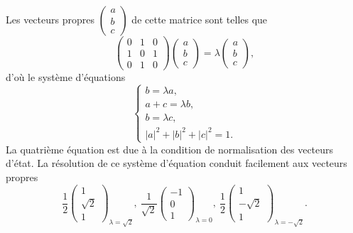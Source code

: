 \begin{example}
Les vecteurs propres $\begin{pmatrix} a\\b\\c\end{pmatrix} $ de cette matrice
sont telles que
\begin{equation}
\begin{pmatrix}
0 & 1 & 0\\
1 & 0 & 1\\
0 & 1 & 0
\end{pmatrix} \begin{pmatrix}
a\\
b\\
c
\end{pmatrix} =\lambda\begin{pmatrix}
a\\
b\\
c
\end{pmatrix} ,
\end{equation}
d'où le système d'équations%
\begin{equation}
\begin{cases}
b=\lambda a,\\
a+c=\lambda b,\\
b=\lambda c,\\
|a|^{2}+|b|^{2}+|c|^{2}=1.
\end{cases}
\end{equation}
La quatrième équation est due à la condition de normalisation des vecteurs
d'état. La résolution de ce système d'équation conduit facilement aux
vecteurs propres
\begin{equation}
\frac{1}{2}\begin{pmatrix}
1\\
\sqrt{2}\\
1
\end{pmatrix}
_{\lambda=\sqrt{2}},\ \frac{1}{\sqrt{2}}\begin{pmatrix}
-1\\
0\\
1
\end{pmatrix}_{\lambda=0},\ \frac{1}{2}\begin{pmatrix}
1\\
-\sqrt{2}\\
1
\end{pmatrix}_{\lambda=-\sqrt{2}}.
\end{equation}

\end{example}

